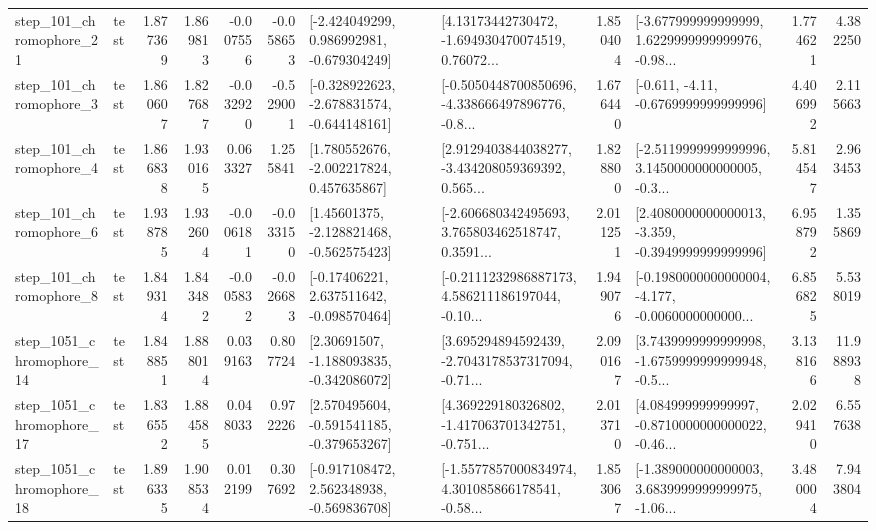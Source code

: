 \begin{tabular}{llrrrrllrlrr}
  step\_101\_chromophore\_21 &      test &      1.877369 &    1.869813 &     -0.007556 & -0.058653 &   [-2.424049299, 0.986992981, -0.679304249] &  [4.13173442730472, -1.694930470074519, 0.76072... &       1.850404 &  [-3.677999999999999, 1.6229999999999976, -0.98... &            1.774621 &          4.382250 \\
   step\_101\_chromophore\_3 &      test &      1.860607 &    1.827687 &     -0.032920 & -0.529001 &  [-0.328922623, -2.678831574, -0.644148161] &  [-0.5050448700850696, -4.338666497896776, -0.8... &       1.676440 &               [-0.611, -4.11, -0.6769999999999996] &            4.406992 &          2.115663 \\
   step\_101\_chromophore\_4 &      test &      1.866838 &    1.930165 &      0.063327 &  1.255841 &    [1.780552676, -2.002217824, 0.457635867] &  [2.9129403844038277, -3.434208059369392, 0.565... &       1.828800 &  [-2.5119999999999996, 3.1450000000000005, -0.3... &            5.814547 &          2.963453 \\
   step\_101\_chromophore\_6 &      test &      1.938785 &    1.932604 &     -0.006181 & -0.033150 &    [1.45601375, -2.128821468, -0.562575423] &  [-2.606680342495693, 3.765803462518747, 0.3591... &       2.011251 &  [2.4080000000000013, -3.359, -0.3949999999999996] &            6.958792 &          1.355869 \\
   step\_101\_chromophore\_8 &      test &      1.849314 &    1.843482 &     -0.005832 & -0.026683 &    [-0.17406221, 2.637511642, -0.098570464] &  [-0.2111232986887173, 4.586211186197044, -0.10... &       1.949076 &  [-0.1980000000000004, -4.177, -0.0060000000000... &            6.856825 &          5.538019 \\
 step\_1051\_chromophore\_14 &      test &      1.848851 &    1.888014 &      0.039163 &  0.807724 &    [2.30691507, -1.188093835, -0.342086072] &  [3.695294894592439, -2.7043178537317094, -0.71... &       2.090167 &  [3.7439999999999998, -1.6759999999999948, -0.5... &            3.138166 &         11.988938 \\
 step\_1051\_chromophore\_17 &      test &      1.836552 &    1.884585 &      0.048033 &  0.972226 &   [2.570495604, -0.591541185, -0.379653267] &  [4.369229180326802, -1.417063701342751, -0.751... &       2.013710 &  [4.084999999999997, -0.8710000000000022, -0.46... &            2.029410 &          6.557638 \\
 step\_1051\_chromophore\_18 &      test &      1.896335 &    1.908534 &      0.012199 &  0.307692 &   [-0.917108472, 2.562348938, -0.569836708] &  [-1.5577857000834974, 4.301085866178541, -0.58... &       1.853067 &  [-1.389000000000003, 3.6839999999999975, -1.06... &            3.480004 &          7.943804 \\

\end{tabular}
